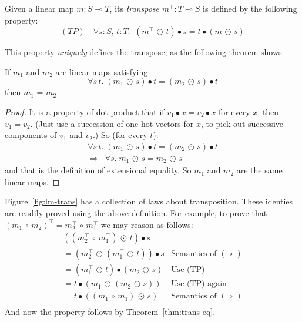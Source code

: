\documentclass[sigplan,review]{acmart}
\newcommand{\linto}{\multimap}     %
\newcommand{\tcolon}{\!:\!}
\newcommand{\dotprod}{\bullet}    %
\newcommand{\lmcomp}{\,\circ\,}   %
\newcommand{\lmapply}{\,\odot\,}      %
\newcommand{\lmtrans}[1]{#1^{\top}}   %
\begin{document}
\begin{definition}
Given a linear map $m : S \linto T$, its \emph{transpose} $\lmtrans{m} : T \linto S$
is defined by the following property:
$$
(TP)\quad \forall s\tcolon S,\, t \tcolon T.\;\;  (\lmtrans{m} \lmapply t) \dotprod s =  t \dotprod (m \lmapply s)
$$
\end{definition}
\noindent
This property \emph{uniquely} defines the transpose, as the following theorem shows:
\begin{theorem} \label{thm:trans-eq}
  If $m_1$ and $m_2$ are linear maps satisfying
  $$\forall s\, t.\; (m_1 \lmapply s) \dotprod t
                              = (m_2 \lmapply s) \dotprod t$$
  then $m_1$ = $m_2$
\end{theorem}
\begin{proof}
  It is a property of dot-product that if $v_1 \dotprod x = v_2 \dotprod x$ for every
  $x$, then $v_1 = v_2$.  (Just use a succession of one-hot vectors for $x$,
  to pick out successive components of $v_1$ and $v_2$.) So
  (for every $t$):
$$
\begin{array}{ll}
\forall s\, t.\; (m_1 \lmapply s) \dotprod t
                              = (m_2 \lmapply s) \dotprod t \\
\Rightarrow \;\; \forall s. \; m_1 \lmapply s = m_2 \lmapply s
\end{array}
$$
and that is the definition of extensional equality. So $m_1$ and $m_2$ are the same linear maps.
\end{proof}
Figure~\ref{fig:lm-trans} has a collection of laws about transposition.
These identies are readily proved using the above definition. For example, to prove that
$\lmtrans{(m_1 \lmcomp m_2)}  =  \lmtrans{m_2} \lmcomp \lmtrans{m_1}$ we may reason as follows:
$$
\begin{array}{ll}
  ((\lmtrans{m_2} \lmcomp \lmtrans{m_1}) \lmapply t) \dotprod s \\
  = (\lmtrans{m_2} \lmapply (\lmtrans{m_1} \lmapply t)) \dotprod s  & \mbox{Semantics of $(\lmcomp)$} \\
  = (\lmtrans{m_1} \lmapply t) \dotprod (m_2 \lmapply s)  & \mbox{Use (TP)} \\
  = t \dotprod (m_1 \lmapply (m_2 \lmapply s))  & \mbox{Use (TP) again} \\
  = t \dotprod ((m_1 \lmcomp m_1) \lmapply s)  & \mbox{Semantics of $(\lmcomp)$} \\
\end{array}
$$
And now the property follows by Theorem~\ref{thm:trans-eq}.
\end{document}
